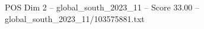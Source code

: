 \begin{textsample}{POS Dim 2 – global\_south\_2023\_11 – Score 33.00 – global\_south\_2023\_11/103575881.txt}
\end{textsample}
